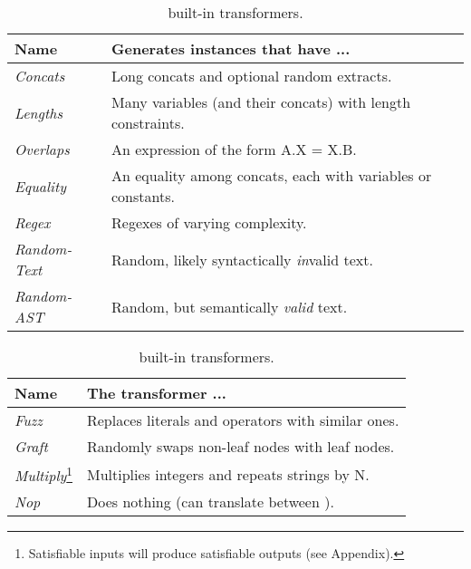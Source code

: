 \begin{table}[t]
    \caption{\fuzzer{} built-in (a) generators and (b) transformers.}
    \begin{subtable}{1\textwidth}
        \centering
        \caption{\generator{} built-in generators.}
        \label{tbl:generators}
        \begin{tabular}{ l l }
            \toprule
            \textbf{Name}
            & \textbf{Generates instances that have ...} \\
            \midrule
            \textit{Concats}
            & Long concats and optional random extracts. \\
            \textit{Lengths}
            & Many variables (and their concats) with length constraints. \\
            \textit{Overlaps}
            & An expression of the form A.X = X.B. \\
            \textit{Equality}
            & An equality among concats, each with variables or constants. \\
            \textit{Regex}
            & Regexes of varying complexity. \\
            \textit{Random-Text}
            & Random, likely syntactically \textit{in}valid text. \\
            \textit{Random-AST}
            & Random, but semantically \textit{valid} text. \\
            \bottomrule
        \end{tabular}
    \end{subtable}
    \begin{subtable}{1\textwidth}
        \centering
        \caption{\transformer{} built-in transformers.}
        \label{tbl:transformers}
        \begin{tabular}{l l}
            \toprule
            \textbf{Name}
            & \textbf{The transformer ...} \\
            \midrule
            \textit{Fuzz}
            & Replaces literals and operators with similar ones.\\
            \textit{Graft}
            & Randomly swaps non-leaf nodes with leaf nodes.\\
            \textit{Multiply}\footnote{Satisfiable inputs 
            will produce satisfiable outputs (see Appendix).}
            & Multiplies integers and repeats strings by N.\\
            \textit{Nop}
            & Does nothing (can translate between \smtfull{}).\\

\end{tabular}
\end{subtable}
\end{table}
